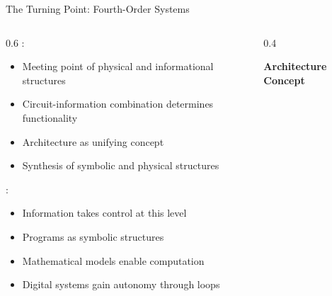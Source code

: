 \begin{frame}{The Turning Point: Fourth-Order Systems}
\begin{columns}
\begin{column}{0.6\textwidth}
:
\begin{itemize}
\item Meeting point of physical and informational structures
\item Circuit-information combination determines functionality
\item Architecture as unifying concept
\item Synthesis of symbolic and physical structures
\end{itemize}

\vspace{0.3cm}
:
\begin{itemize}
\item Information takes control at this level
\item Programs as symbolic structures
\item Mathematical models enable computation
\item Digital systems gain autonomy through loops
\end{itemize}
\end{column}
\begin{column}{0.4\textwidth}
\begin{center}
\textbf{Architecture Concept}
\vspace{0.3cm}

\end{center}
\end{column}
\end{columns}
\end{frame}

